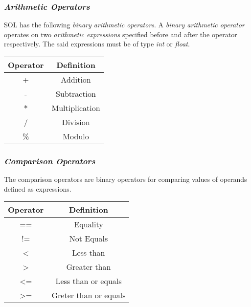 \documentclass[letterpaper,12pt]{article}
\begin{document}
        \subsubsection{\textit{Arithmetic Operators}}
        SOL has the following \textit{binary arithmetic operators}. A \textit{binary arithmetic operator} operates on two \textit{arithmetic expressions} specified before and after the operator respectively. The said expressions must be of type \textit{int} or \textit{float}.

            \begin{center}
                \begin{tabular}{ |c|c| }
                \hline
                    \textbf{Operator} & \textbf{Definition} \\
                    \hline
                    +   &   Addition\\
                    -   &   Subtraction\\
                    *   &   Multiplication\\
                    /   &   Division\\
                    \%  &   Modulo\\
                \hline
                \end{tabular}
            \end{center}

        \subsubsection{\textit{Comparison Operators}}
        The comparison operators are binary operators for comparing values of operands defined as expressions.
            \begin{center}
                \begin{tabular}{ |c|c| }
                \hline
                    \textbf{Operator} & \textbf{Definition} \\
                    \hline
                    ==  & Equality \\
                    !=  & Not Equals \\
                    <   & Less than \\
                    >   & Greater than \\
                    <=  & Less than or equals \\
                    >=  & Greter than or equals \\
                \hline
                \end{tabular}
            \end{center}
        
\end{document}

